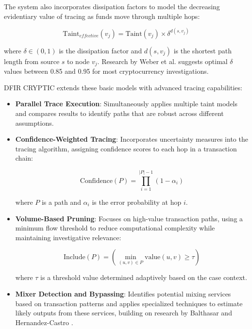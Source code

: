\documentclass[conference]{IEEEtran}
\begin{document}
The system also incorporates dissipation factors to model the decreasing evidentiary value of tracing as funds move through multiple hops:

\begin{equation}
\text{Taint}_{effective}(v_j) = \text{Taint}(v_j) \times \delta^{d(s,v_j)}
\end{equation}

where $\delta \in (0,1)$ is the dissipation factor and $d(s,v_j)$ is the shortest path length from source $s$ to node $v_j$. Research by Weber et al. \cite{weber2019} suggests optimal $\delta$ values between 0.85 and 0.95 for most cryptocurrency investigations.

DFIR CRYPTIC extends these basic models with advanced tracing capabilities:

\begin{itemize}
    \item \textbf{Parallel Trace Execution}: Simultaneously applies multiple taint models and compares results to identify paths that are robust across different assumptions.
    
    \item \textbf{Confidence-Weighted Tracing}: Incorporates uncertainty measures into the tracing algorithm, assigning confidence scores to each hop in a transaction chain:
    
    \begin{equation}
    \text{Confidence}(P) = \prod_{i=1}^{|P|-1} (1 - \alpha_i)
    \end{equation}
    
    where $P$ is a path and $\alpha_i$ is the error probability at hop $i$.
    
    \item \textbf{Volume-Based Pruning}: Focuses on high-value transaction paths, using a minimum flow threshold to reduce computational complexity while maintaining investigative relevance:
    
    \begin{equation}
    \text{Include}(P) = \left(\min_{(u,v) \in P} \text{value}(u,v) \geq \tau\right)
    \end{equation}
    
    where $\tau$ is a threshold value determined adaptively based on the case context.
    
    \item \textbf{Mixer Detection and Bypassing}: Identifies potential mixing services based on transaction patterns and applies specialized techniques to estimate likely outputs from these services, building on research by Balthasar and Hernandez-Castro \cite{balthasar2017}.
\end{itemize}
\end{document}
